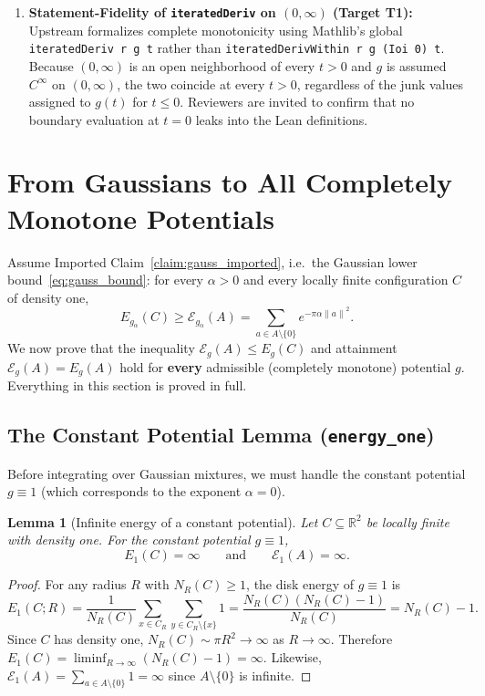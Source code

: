 \documentclass[11pt, a4paper]{article}
\newtheorem{lemma}[theorem]{Lemma}
\theoremstyle{definition}
\theoremstyle{remark}
\newcommand{\R}{\mathbb{R}}
\newcommand{\Ecal}{\mathcal{E}}
\newcommand{\norm}[1]{\left\lVert #1 \right\rVert}
\begin{document}
\begin{enumerate}[label=\textbf{\arabic*.}]
\begin{itemize}
\begin{enumerate}[label=\textbf{RT-Q\arabic*:}, leftmargin=*]
            \item \textbf{Statement-Fidelity of \texttt{iteratedDeriv} on $(0, \infty)$ (Target T1):} Upstream formalizes complete monotonicity using Mathlib's global \texttt{iteratedDeriv r g t} rather than \texttt{iteratedDerivWithin r g (Ioi 0) t}. Because $(0, \infty)$ is an open neighborhood of every $t > 0$ and $g$ is assumed $C^\infty$ on $(0, \infty)$, the two coincide at every $t > 0$, regardless of the junk values assigned to $g(t)$ for $t \le 0$. Reviewers are invited to confirm that no boundary evaluation at $t = 0$ leaks into the Lean definitions.
        \end{enumerate}
    \end{itemize}
\end{enumerate}

\section{From Gaussians to All Completely Monotone Potentials}
\label{sec:gauss_to_cm}

Assume Imported Claim~\ref{claim:gauss_imported}, i.e.\ the Gaussian lower bound~\eqref{eq:gauss_bound}: for every $\alpha > 0$ and every locally finite configuration $C$ of density one,
\[
E_{g_\alpha}(C) \ge \Ecal_{g_\alpha}(A) = \sum_{a \in A \setminus \{0\}} e^{-\pi \alpha \norm{a}^2}.
\]
We now prove that the inequality $\Ecal_g(A) \le E_g(C)$ and attainment $\Ecal_g(A) = E_g(A)$ hold for \textbf{every} admissible (completely monotone) potential $g$. Everything in this section is proved in full.

\subsection{The Constant Potential Lemma (\texttt{energy\_one})}

Before integrating over Gaussian mixtures, we must handle the constant potential $g \equiv 1$ (which corresponds to the exponent $\alpha = 0$).

\begin{lemma}[Infinite energy of a constant potential]
\label{lem:energy_one}
Let $C \subseteq \R^2$ be locally finite with density one. For the constant potential $g \equiv 1$,
\[
E_1(C) = \infty \qquad \text{and} \qquad \Ecal_1(A) = \infty.
\]
\end{lemma}

\begin{proof}
For any radius $R$ with $N_R(C) \ge 1$, the disk energy of $g \equiv 1$ is
\[
E_1(C; R) = \frac{1}{N_R(C)} \sum_{x \in C_R} \sum_{y \in C_R \setminus \{x\}} 1 = \frac{N_R(C)\left(N_R(C) - 1\right)}{N_R(C)} = N_R(C) - 1.
\]
Since $C$ has density one, $N_R(C) \sim \pi R^2 \to \infty$ as $R \to \infty$. Therefore $E_1(C) = \liminf_{R \to \infty} (N_R(C) - 1) = \infty$. Likewise, $\Ecal_1(A) = \sum_{a \in A \setminus \{0\}} 1 = \infty$ since $A \setminus \{0\}$ is infinite.
\end{proof}
\end{document}
